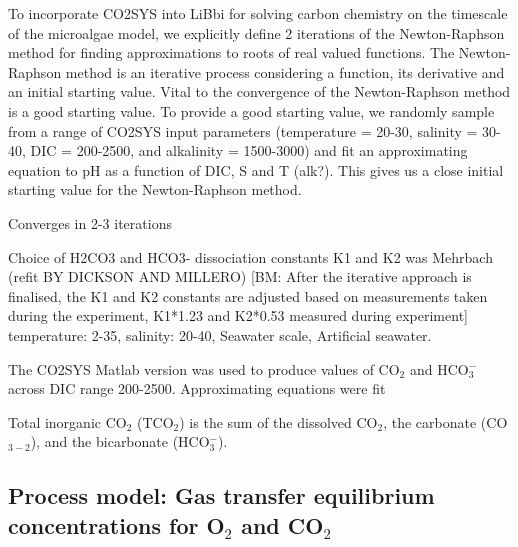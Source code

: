 \documentclass{ruthesis}
\begin{document}
To incorporate CO2SYS into LiBbi for solving carbon chemistry on the timescale of the microalgae model, we explicitly define 2 iterations of the Newton-Raphson method for finding approximations to roots of real valued functions. The Newton-Raphson method is an iterative process considering a function, its derivative and an initial starting value. Vital to the convergence of the Newton-Raphson method is a good starting value. To provide a good starting value, we randomly sample from a range of CO2SYS input parameters (temperature = 20-30, salinity = 30-40, DIC = 200-2500, and alkalinity = 1500-3000) and fit an approximating equation to pH as a function of DIC, S and T (alk?). This gives us a close initial starting value for the Newton-Raphson method. 

Converges in 2-3 iterations 



Choice of H2CO3 and HCO3- dissociation constants K1 and K2 was Mehrbach (refit BY DICKSON AND MILLERO) [BM: After the iterative approach is finalised, the K1 and K2 constants are adjusted based on measurements taken during the experiment, K1*1.23 and K2*0.53 measured during experiment] temperature: 2-35,  salinity: 20-40, Seawater scale, Artificial seawater.



The CO2SYS Matlab version \cite{van2011matlab} was used to produce values of CO$_2$ and HCO$_3^-$ across DIC range 200-2500. 
Approximating equations were fit


Total inorganic CO$_2$ (TCO$_2$) is the sum of the dissolved CO$_2$, the carbonate (CO$_{3-2}$), and the bicarbonate (HCO$_3^-$).




\subsection{Process model: Gas transfer equilibrium concentrations for O$_2$ and CO$_2$}


\end{document}
